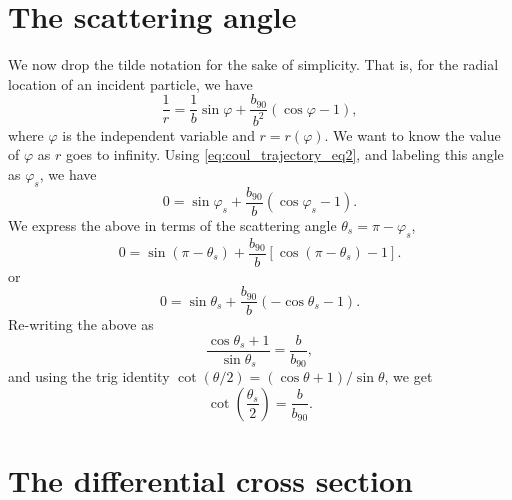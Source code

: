 \documentclass[a4paper,11pt]{report}
\begin{document}
\section{The scattering angle}
We now drop the tilde notation for the sake of simplicity. That is, for the radial location of an incident particle, we have
\begin{equation}
    \label{eq:coul_trajectory_eq2}
    \frac{1}{r} = \frac{1}{b} \sin \varphi + \frac{b_{90}}{b^2} \left ( \cos \varphi - 1 \right ),
\end{equation}
where $\varphi$ is the independent variable and $r = r(\varphi)$. We want to know the value of $\varphi$ as $r$ goes to infinity. Using \cref{eq:coul_trajectory_eq2}, and labeling this angle as $\varphi_s$, we have
\begin{equation*}
    0 = \sin \varphi_s + \frac{b_{90}}{b} \left ( \cos \varphi_s - 1 \right ).
\end{equation*}
We express the above in terms of the scattering angle $\theta_s = \pi - \varphi_s$,
\begin{equation*}
    0 = \sin (\pi - \theta_s) + \frac{b_{90}}{b} \left [ \cos \left (\pi - \theta_s \right ) - 1 \right ].
\end{equation*}
or
\begin{equation*}
    0 = \sin \theta_s + \frac{b_{90}}{b} \left ( -\cos \theta_s - 1 \right ).
\end{equation*}
Re-writing the above as
\begin{equation*}
    \frac{\cos \theta_s + 1}{\sin \theta_s} = \frac{b}{b_{90}},
\end{equation*}
and using the trig identity $\cot (\theta/2) = (\cos \theta + 1) / \sin \theta$, we get 
\begin{equation}
    \label{eq:coul_scattering_angle}
    \cot \left ( \frac{ \theta_s }{2} \right ) = \frac{b}{b_{90}}.
\end{equation}

\section{The differential cross section}
\end{document}
